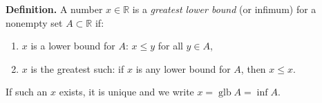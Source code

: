 \textbf{Definition.} A number $x \in \mathbb{R}$ is a \textit{greatest lower bound} (or infimum) for a nonempty set $A \subset \mathbb{R}$ if:
\begin{enumerate}
\item $x$ is a lower bound for $A$: $x \leq y$ for all $y \in A$,
\item $x$ is the greatest such: if $x$ is any lower bound for $A$, then $x \leq x$.
\end{enumerate}
If such an $x$ exists, it is unique and we write $x = \operatorname{glb} A = \inf A$.
